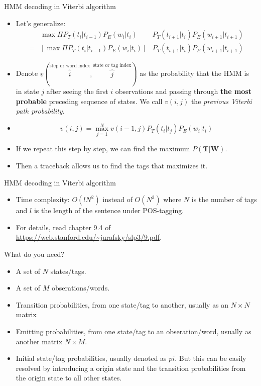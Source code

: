 \documentclass[11pt]{beamer}
\newcommand{\argmaxF}{\mathop{\mathrm{argmax}}\limits}
\begin{document}
\begin{frame}{HMM decoding in Viterbi algorithm}
\begin{itemize}[<+->]
 \item Let's generalize: 
 \begin{align*}
  &  \max \Pi P_T(t_i|t_{i-1}) P_E(w_i| t_i) & P_T(t_{i+1}|t_i) P_E(w_{i+1}| t_{i+1}) \\
  = &  \left [  \max \Pi P_T(t_i|t_{i-1}) P_E(w_i| t_i) \right ] & P_T(t_{i+1}|t_i) P_E(w_{i+1}| t_{i+1})
  \end{align*}
 \item Denote $v(\overbrace{i}^{\text{step or word index}}, \overbrace{j}^{\text{state or tag index}})$ as the probability that the HMM is in state $j$ after seeing the first $i$ observations and passing through \textbf{the most probable} preceding sequence of states. We call $v(i,j)$ the \emph{previous Viterbi path probability}. 
 \item 
 $$
 v(i,j) = \max_{j=1}^N v(i-1, j)P_T(t_i|t_j) P_E(w_i|t_i)
 $$
 \item If we repeat this step by step, we can find the maximum $P(\mathbf{T}|\mathbf{W})$. 
 \item Then a traceback allows us to find the tags that maximizes it.
 \end{itemize} 
\end{frame}

\begin{frame}{HMM decoding in Viterbi algorithm}
 \begin{itemize}
  \item Time complexity: $O(lN^2)$ instead of $O(N^3)$ where $N$ is the number of tags and $l$ is the length of the sentence under  POS-tagging. 
  \item For details, read chapter 9.4 of \url{https://web.stanford.edu/~jurafsky/slp3/9.pdf}.
 \end{itemize}
\end{frame}

\begin{frame}{What do you need?}
  \begin{itemize}[<+->]
    \item A set of $N$ states/tags. 
    \item A set of $M$ obserations/words.
    \item Transition probabilities, from one state/tag to another, usually as an $N\times N$ matrix
    \item Emitting probabilities, from one state/tag to an obseration/word, usually as another matrix $N\times M$. 
    \item Initial state/tag probabilities, usually denoted as $pi$. But this can be easily resolved by introducing a origin state and the transition probabilities from the origin state to all other states. 
  \end{itemize}
\end{frame}  
\end{document}
